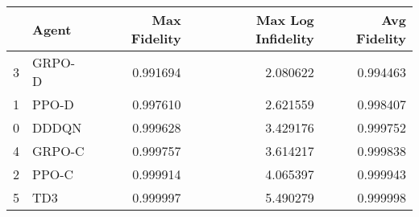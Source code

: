 \begin{tabular}{llrrr}
\toprule
 & Agent & Max Fidelity & Max Log Infidelity & Avg Fidelity \\
\midrule
3 & GRPO-D & 0.991694 & 2.080622 & 0.994463 \\
1 & PPO-D & 0.997610 & 2.621559 & 0.998407 \\
0 & DDDQN & 0.999628 & 3.429176 & 0.999752 \\
4 & GRPO-C & 0.999757 & 3.614217 & 0.999838 \\
2 & PPO-C & 0.999914 & 4.065397 & 0.999943 \\
5 & TD3 & 0.999997 & 5.490279 & 0.999998 \\
\bottomrule
\end{tabular}
